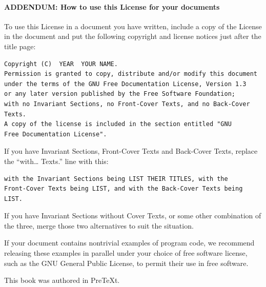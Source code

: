 \documentclass[10pt,]{book}
\theoremstyle{plain}
\theoremstyle{definition}
\theoremstyle{definition}
\theoremstyle{definition}
\theoremstyle{definition}
\numberwithin{equation}{section}
\begin{document}
\paragraph[{ADDENDUM: How to use this License for your documents}]{ADDENDUM: How to use this License for your documents}\hypertarget{gfdl-addendum}{}
To use this License in a document you have written, include a copy of the License in the document and put the following copyright and license notices just after the title page:%
\begin{verbatim}
Copyright (C)  YEAR  YOUR NAME.
Permission is granted to copy, distribute and/or modify this document
under the terms of the GNU Free Documentation License, Version 1.3
or any later version published by the Free Software Foundation;
with no Invariant Sections, no Front-Cover Texts, and no Back-Cover Texts.
A copy of the license is included in the section entitled "GNU
Free Documentation License".
\end{verbatim}
If you have Invariant Sections, Front-Cover Texts and Back-Cover Texts, replace the ``with\dots{} Texts.'' line with this:%
\begin{verbatim}
with the Invariant Sections being LIST THEIR TITLES, with the
Front-Cover Texts being LIST, and with the Back-Cover Texts being LIST.
\end{verbatim}
If you have Invariant Sections without Cover Texts, or some other combination of the three, merge those two alternatives to suit the situation.%
\par
If your document contains nontrivial examples of program code, we recommend releasing these examples in parallel under your choice of free software license, such as the GNU General Public License, to permit their use in free software.%
%
\backmatter
%
\cleardoublepage
\pagestyle{empty}
\centerline{This book was authored in PreTeXt.%
}
\end{document}
